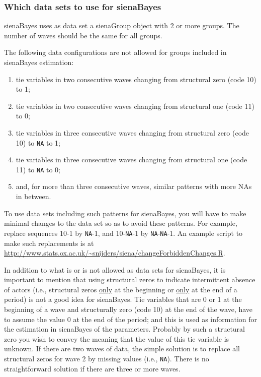 \documentclass[a4paper,fleqn,11pt]{article}
\newcommand{\+}{\, + \,}
\newcommand{\sfn}[1]{\textsf{#1}}
\begin{document}
\subsubsection{Which data sets to use for sienaBayes}
\label{S_sBData}

\textsf{sienaBayes} uses as data set a \sfn{sienaGroup} object with 2 or more groups.
The number of waves should be the same for all groups.

The following data configurations are not allowed for groups
included in \textsf{sienaBayes} estimation:
\begin{enumerate}
\item tie variables in two consecutive waves changing from
    structural zero (code 10) to 1;
\item tie variables in two consecutive waves changing from
    structural one (code 11) to 0;
\item tie variables in three consecutive waves changing from
    structural zero (code 10) to \texttt{NA} to 1;
\item tie variables in three consecutive waves changing from
    structural one (code 11) to \texttt{NA} to 0;
\item and, for more than three consecutive waves, similar patterns
    with more NAs in between.
\end{enumerate}
To use data sets including such patterns for \textsf{sienaBayes},
you will have to make minimal changes to the data set
so as to avoid these patterns.
For example, replace sequences 10-1 by \texttt{NA}-1,
and 10-\texttt{NA}-1 by \texttt{NA}-\texttt{NA}-1.
An example script to make such replacements is at
{\small{\url{http://www.stats.ox.ac.uk/~snijders/siena/changeForbiddenChanges.R}}}.

In addition to what is or is not allowed as data sets for \textsf{sienaBayes},
it is important to mention that using structural zeros to indicate
intermittent absence of actors (i.e., structural zeros \underline{only} at the beginning
or  \underline{only} at the end of a period) is not a good idea
for \textsf{sienaBayes}.
Tie variables that are 0 or 1 at the beginning of a wave and
structurally zero (code 10) at the end of the wave, have to assume
the value 0 at the end of the period; and this is used as information
for the estimation in \textsf{sienaBayes} of the parameters.
Probably by such a structural zero you wish to convey the meaning that the value
of this tie variable is unknown.
If there are two waves of data, the simple solution is to replace
all structural zeros for wave 2 by missing values (i.e., \texttt{NA}).
There is no straightforward solution if there are three or more waves.
\medskip
\end{document}
